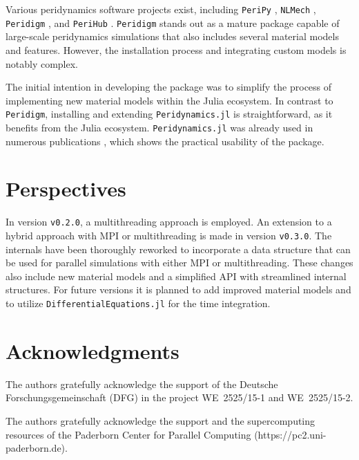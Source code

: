 \documentclass{juliacon}
\begin{document}
Various peridynamics software projects exist, including \texttt{PeriPy} \cite{PeriPy2021}, \texttt{NLMech} \cite{Jha2021}, \texttt{Peridigm} \cite{Peridigm2024}, and \texttt{PeriHub} \cite{Willberg2023}.
\texttt{Peridigm} stands out as a mature package capable of large-scale peridynamics simulations that also 
includes several material models and features.
However, the installation process and integrating custom models is notably complex.

The initial intention in developing the package was to simplify the process of implementing new material models within the Julia ecosystem.
In contrast to \texttt{Peridigm}, installing and extending \texttt{Peridynamics.jl} is straightforward, as it benefits from the Julia ecosystem.
\texttt{Peridynamics.jl} was already used in numerous publications \cite{Friebertshaeuser2022PAMM,Friebertshaeuser2022AIMS,Partmann2023IJF,Partmann2024AAM,Partmann2024PAMM,Tornquist2022PAMM}, which shows the practical usability of the package.

\section{Perspectives}
In version \texttt{v0.2.0}, a multithreading approach is employed.
An extension to a hybrid approach with MPI or multithreading is made in version \texttt{v0.3.0}.
The internals have been thoroughly reworked to incorporate a data structure that can be used for parallel simulations with either MPI or multithreading.
These changes also include new material models and a simplified API with streamlined internal structures.
For future versions it is planned to add improved material models and to utilize \texttt{DifferentialEquations.jl} for the time integration.

\section{Acknowledgments}
The authors gratefully acknowledge the support of the Deutsche Forschungsgemeinschaft (DFG) in the project \mbox{WE~2525/15-1} and \mbox{WE~2525/15-2}.

The authors gratefully acknowledge the support and the supercomputing resources of the Paderborn Center for Parallel Computing (https://pc2.uni-paderborn.de).



\end{document}
